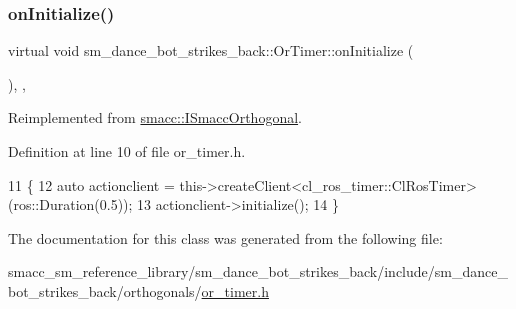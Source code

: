 \subsubsection{\texorpdfstring{on\+Initialize()}{onInitialize()}}
{\footnotesize\ttfamily virtual void sm\+\_\+dance\+\_\+bot\+\_\+strikes\+\_\+back\+::\+Or\+Timer\+::on\+Initialize (\begin{DoxyParamCaption}{ }\end{DoxyParamCaption})\hspace{0.3cm}{\ttfamily [inline]}, {\ttfamily [override]}, {\ttfamily [virtual]}}



Reimplemented from \hyperlink{classsmacc_1_1ISmaccOrthogonal_a6bb31c620cb64dd7b8417f8705c79c7a}{smacc\+::\+I\+Smacc\+Orthogonal}.



Definition at line 10 of file or\+\_\+timer.\+h.


\begin{DoxyCode}
11     \{
12         \textcolor{keyword}{auto} actionclient = this->createClient<cl\_ros\_timer::ClRosTimer>(ros::Duration(0.5));
13         actionclient->initialize();
14     \}
\end{DoxyCode}


The documentation for this class was generated from the following file\+:\begin{DoxyCompactItemize}
\item 
smacc\+\_\+sm\+\_\+reference\+\_\+library/sm\+\_\+dance\+\_\+bot\+\_\+strikes\+\_\+back/include/sm\+\_\+dance\+\_\+bot\+\_\+strikes\+\_\+back/orthogonals/\hyperlink{sm__dance__bot__strikes__back_2include_2sm__dance__bot__strikes__back_2orthogonals_2or__timer_8h}{or\+\_\+timer.\+h}\end{DoxyCompactItemize}
